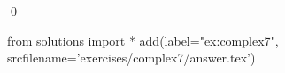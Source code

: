 
\begin{ex} 
  \label{ex:complex7}
  
  \qed
\end{ex} 
\begin{python0}
from solutions import *
add(label="ex:complex7",
    srcfilename='exercises/complex7/answer.tex') 
\end{python0}
